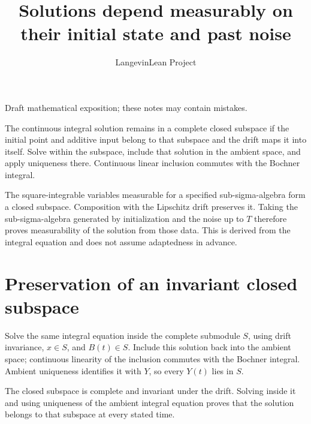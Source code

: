 \documentclass[11pt,a4paper]{article}
\title{\texorpdfstring{Solutions depend measurably on their initial state and past noise}{Solutions depend measurably on their initial state and past noise}}
\author{LangevinLean Project}
\date{}
\begin{document}
\maketitle
Draft mathematical exposition; these notes may contain mistakes.


The continuous integral solution remains in a complete closed subspace if the initial point and additive input belong to that subspace and the drift maps it into itself. Solve within the subspace, include that solution in the ambient space, and apply uniqueness there. Continuous linear inclusion commutes with the Bochner integral.



The square-integrable variables measurable for a specified sub-sigma-algebra form a closed subspace. Composition with the Lipschitz drift preserves it. Taking the sub-sigma-algebra generated by initialization and the noise up to \(T\) therefore proves measurability of the solution from those data. This is derived from the integral equation and does not assume adaptedness in advance.


\section{\texorpdfstring{Preservation of an invariant closed subspace}{Preservation of an invariant closed subspace}}


Solve the same integral equation inside the complete submodule \(S\), using drift invariance, \(x\in S\), and \(B(t)\in S\). Include this solution back into the ambient space; continuous linearity of the inclusion commutes with the Bochner integral. Ambient uniqueness identifies it with \(Y\), so every \(Y(t)\) lies in \(S\).



The closed subspace is complete and invariant under the drift. Solving inside it and using uniqueness of the ambient integral equation proves that the solution belongs to that subspace at every stated time.
\end{document}
